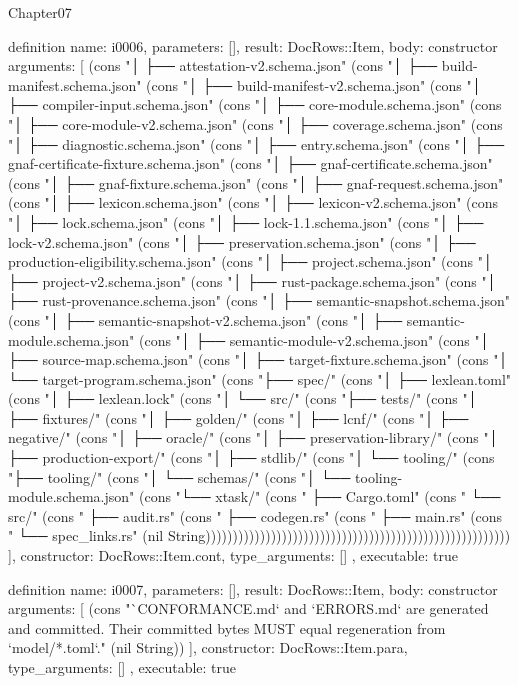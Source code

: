 \begin{lexlean}{Chapter07}
\begin{semanticmodule}
definition{
  name: i0006,
  parameters: [],
  result: DocRows::Item,
  body: constructor{
    arguments: [
      (cons "│   ├── attestation-v2.schema.json" (cons "│   ├── build-manifest.schema.json" (cons "│   ├── build-manifest-v2.schema.json" (cons "│   ├── compiler-input.schema.json" (cons "│   ├── core-module.schema.json" (cons "│   ├── core-module-v2.schema.json" (cons "│   ├── coverage.schema.json" (cons "│   ├── diagnostic.schema.json" (cons "│   ├── entry.schema.json" (cons "│   ├── gnaf-certificate-fixture.schema.json" (cons "│   ├── gnaf-certificate.schema.json" (cons "│   ├── gnaf-fixture.schema.json" (cons "│   ├── gnaf-request.schema.json" (cons "│   ├── lexicon.schema.json" (cons "│   ├── lexicon-v2.schema.json" (cons "│   ├── lock.schema.json" (cons "│   ├── lock-1.1.schema.json" (cons "│   ├── lock-v2.schema.json" (cons "│   ├── preservation.schema.json" (cons "│   ├── production-eligibility.schema.json" (cons "│   ├── project.schema.json" (cons "│   ├── project-v2.schema.json" (cons "│   ├── rust-package.schema.json" (cons "│   ├── rust-provenance.schema.json" (cons "│   ├── semantic-snapshot.schema.json" (cons "│   ├── semantic-snapshot-v2.schema.json" (cons "│   ├── semantic-module.schema.json" (cons "│   ├── semantic-module-v2.schema.json" (cons "│   ├── source-map.schema.json" (cons "│   ├── target-fixture.schema.json" (cons "│   └── target-program.schema.json" (cons "├── spec/" (cons "│   ├── lexlean.toml" (cons "│   ├── lexlean.lock" (cons "│   └── src/" (cons "├── tests/" (cons "│   ├── fixtures/" (cons "│   ├── golden/" (cons "│   ├── lcnf/" (cons "│   ├── negative/" (cons "│   ├── oracle/" (cons "│   ├── preservation-library/" (cons "│   ├── production-export/" (cons "│   ├── stdlib/" (cons "│   └── tooling/" (cons "├── tooling/" (cons "│   └── schemas/" (cons "│       └── tooling-module.schema.json" (cons "└── xtask/" (cons "    ├── Cargo.toml" (cons "    └── src/" (cons "        ├── audit.rs" (cons "        ├── codegen.rs" (cons "        ├── main.rs" (cons "        └── spec_links.rs" (nil String))))))))))))))))))))))))))))))))))))))))))))))))))))))))
    ],
    constructor: DocRows::Item.cont,
    type_arguments: []
  },
  executable: true
}

definition{
  name: i0007,
  parameters: [],
  result: DocRows::Item,
  body: constructor{
    arguments: [
      (cons "`CONFORMANCE.md` and `ERRORS.md` are generated and committed. Their committed bytes MUST equal regeneration from `model/*.toml`." (nil String))
    ],
    constructor: DocRows::Item.para,
    type_arguments: []
  },
  executable: true
}


\end{semanticmodule}
\end{lexlean}

